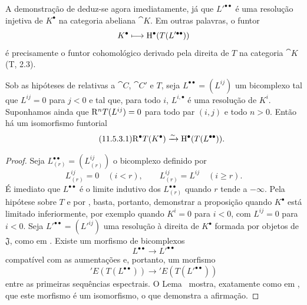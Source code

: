 \begin{env}[11.5.2.5]
\label{0.11.5.2.5}
A demonstração de  deduz-se agora imediatamente, já que $L'^{\bullet\bullet}$ é uma resolução injetiva de $K^\bullet$ na categoria abeliana $\cat{K}$.
Em outras palavras, o funtor
\[
  K^\bullet\longmapsto\mathrm{H}^\bullet(T(L'^{\bullet\bullet}))
\]
é precisamente o funtor cohomológico derivado pela direita de $T$ na categoria $\cat{K}$ (T, 2.3).
\end{env}

\begin{proposition}[11.5.3]
\label{0.11.5.3}
Sob as hipóteses de  relativas a $\cat{C}$, $\cat{C}'$ e $T$, seja $L^{\bullet\bullet}=(L^{ij})$ um bicomplexo tal que $L^{ij}=0$ para $j<0$ e tal que, para todo $i$, $L^{i,\bullet}$ é uma resolução de $K^i$.
Suponhamos ainda que $\mathrm{R}^nT(L^{ij})=0$ para todo par $(i,j)$ e todo $n>0$.
Então há um isomorfismo funtorial
\[
\label{0.11.5.3.1}
\tag{11.5.3.1}
  \RR^\bullet T(K^\bullet)
  \simto
  \HH^\bullet(T(L^{\bullet\bullet})).
\]
\end{proposition}

\begin{proof}
Seja $L^{\bullet\bullet}_{(r)}=(L^{ij}_{(r)})$ o bicomplexo definido por
\[
  L^{ij}_{(r)}=0\quad(i<r),\qquad
  L^{ij}_{(r)}=L^{ij}\quad(i\geq r).
\]
É imediato que $L^{\bullet\bullet}$ é o limite indutivo dos $L^{\bullet\bullet}_{(r)}$ quando $r$ tende a $-\infty$.
Pela hipótese sobre $T$ e por , basta, portanto, demonstrar a proposição quando $K^\bullet$ está limitado inferiormente, por exemplo quando $K^i=0$ para $i<0$, com $L^{ij}=0$ para $i<0$.
Seja $L'^{\bullet\bullet}=(L'^{ij})$ uma resolução à direita de $K^\bullet$ formada por objetos de $\mathfrak{J}$, como em .
Existe um morfismo de bicomplexos
\[
  L^{\bullet\bullet}\longrightarrow L'^{\bullet\bullet}
\]
compatível com as aumentações e, portanto, um morfismo
\[
  'E(T(L^{\bullet\bullet}))\longrightarrow{}'E(T(L'^{\bullet\bullet}))
\]
entre as primeiras sequências espectrais.
O Lema~ mostra, exatamente como em , que este morfismo é um isomorfismo, o que demonstra a afirmação.
\end{proof}


